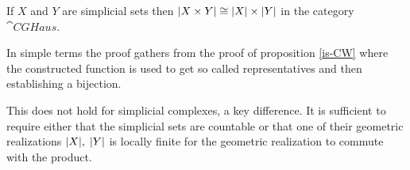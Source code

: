 \documentclass[../../main.tex]{subfiles}
\begin{document}
    \begin{proposition}
        If $X$ and $Y$ are simplicial sets then $\geom[X\times Y]\cong \geom[X]\times \geom[Y]$ in the category $\cat{CGHaus}$.
    \end{proposition}

    In simple terms the proof gathers from the proof of proposition \ref{is-CW} where the constructed function is used to get so called representatives and then establishing a bijection. 

    This does not hold for simplicial complexes, a key difference. It is sufficient to require either that the simplicial sets are countable or that one of their geometric realizations $\geom[X],\; \geom[Y]$ is locally finite for the geometric realization to commute with the product. 
\end{document}
